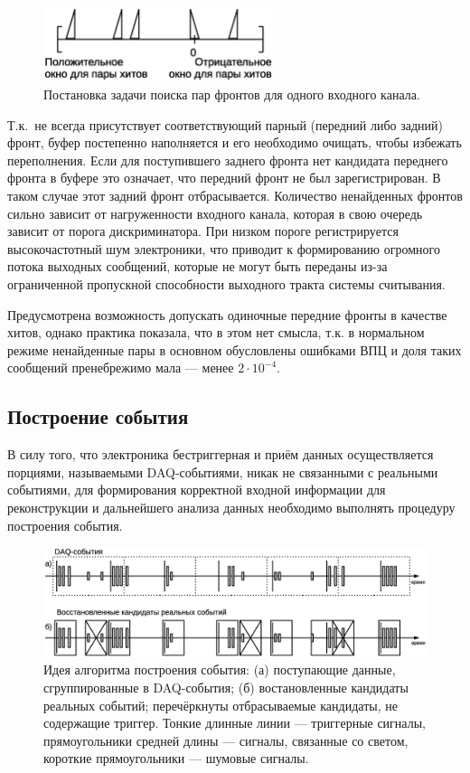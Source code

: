 \begin{figure}[H]
\centering
\includegraphics[width=0.6\textwidth]{pictures/14_Edge_matching_rus.eps}
\caption{Постановка задачи поиска пар фронтов для одного входного канала.}
\label{fig:EdgeMatching}
\end{figure}

Т.к.~не всегда присутствует соответствующий парный (передний либо задний) фронт, буфер постепенно наполняется и его необходимо очищать, чтобы избежать переполнения. Если для поступившего заднего фронта нет кандидата переднего фронта в буфере это означает, что передний фронт не был зарегистрирован. В таком случае этот задний фронт отбрасывается. Количество ненайденных фронтов сильно зависит от нагруженности входного канала, которая в свою очередь зависит от порога дискриминатора. При низком пороге регистрируется высокочастотный шум электроники, что приводит к формированию огромного потока выходных сообщений, которые не могут быть переданы из-за ограниченной пропускной способности выходного тракта системы считывания.

Предусмотрена возможность допускать одиночные передние фронты в качестве хитов, однако практика показала, что в этом нет смысла, т.к. в нормальном режиме ненайденные пары в основном обусловлены ошибками ВПЦ и доля таких сообщений пренебрежимо мала --- менее $ 2 \cdot 10^{-4} $.

\subsection{Построение события}

В силу того, что электроника бестриггерная и приём данных осуществляется порциями, называемыми DAQ-событиями, никак не связанными с реальными событиями, для формирования корректной входной информации для реконструкции и дальнейшего анализа данных необходимо выполнять процедуру построения события.

\begin{figure}[H]
\centering
\includegraphics[width=1.0\textwidth]{pictures/15_Event_building_rus_bw.eps}
\caption{Идея алгоритма построения события: (а) поступающие данные, сгруппированные в DAQ-события; (б) востановленные кандидаты реальных событий; перечёркнуты отбрасываемые кандидаты, не содержащие триггер. Тонкие длинные линии --- триггерные сигналы, прямоугольники средней длины --- сигналы, связанные со светом, короткие прямоугольники --- шумовые сигналы.}
\label{fig:EventBuilding}
\end{figure}

